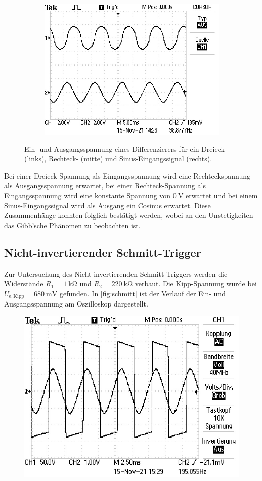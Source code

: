 \begin{figure}[H]
\begin{subfigure}{.4\textwidth}
    \includegraphics[width=\linewidth]{data/ALL0064/F0064TEK.JPG}
  \end{subfigure}
  \caption{Ein- und Ausgangsspannung eines Differenzierers für ein Dreieck- (links), Rechteck- (mitte) und Sinus-Eingangssignal (rechts).}
  \label{fig:diff_oszi}
\end{figure}

Bei einer Dreieck-Spannung als Eingangsspannung wird eine Rechteckspannung als Ausgangsspannung erwartet, bei einer Rechteck-Spannung als Eingangsspannung wird eine konstante Spannung von $\SI{0}{\volt}$ erwartet und bei einem Sinus-Eingangssignal wird als Ausgang ein Cosinus erwartet. Diese Zusammenhänge konnten folglich bestätigt werden, wobei an den Unstetigkeiten das Gibb'sche Phänomen zu beobachten ist.

\subsection{Nicht-invertierender Schmitt-Trigger}

Zur Untersuchung des Nicht-invertierenden Schmitt-Triggers werden die Widerstände $R_1 = \SI{1}{\kilo\ohm}$ und $R_2 = \SI{220}{\kilo\ohm}$ verbaut. Die Kipp-Spannung wurde bei $U_{\mathrm{e, Kipp}} = \SI{680}{\milli\volt}$ gefunden. In \autoref{fig:schmitt} ist der Verlauf der Ein- und Ausgangsspannung am Oszilloskop dargestellt.

\begin{figure}[H]
  \centering
  \includegraphics{data/ALL0066/F0066TEK.JPG}
  \caption{}
  \label{}
\end{figure}
